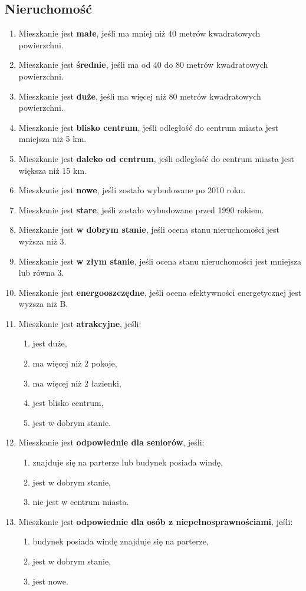 \subsection{Nieruchomość}
\begin{enumerate}[label=N\arabic*.]
    \item Mieszkanie jest \textbf{małe}, jeśli ma mniej niż 40 metrów kwadratowych powierzchni.
    \item Mieszkanie jest \textbf{średnie}, jeśli ma od 40 do 80 metrów kwadratowych powierzchni.
    \item Mieszkanie jest \textbf{duże}, jeśli ma więcej niż 80 metrów kwadratowych powierzchni.
    \item Mieszkanie jest \textbf{blisko centrum}, jeśli odległość do centrum miasta jest mniejsza niż 5 km.
    \item Mieszkanie jest \textbf{daleko od centrum}, jeśli odległość do centrum miasta jest większa niż 15 km.
    \item Mieszkanie jest \textbf{nowe}, jeśli zostało wybudowane po 2010 roku.
    \item Mieszkanie jest \textbf{stare}, jeśli zostało wybudowane przed 1990 rokiem.
    \item Mieszkanie jest \textbf{w dobrym stanie}, jeśli ocena stanu nieruchomości jest wyższa niż 3.
    \item Mieszkanie jest \textbf{w złym stanie}, jeśli ocena stanu nieruchomości jest mniejsza lub równa 3.
    \item Mieszkanie jest \textbf{energooszczędne}, jeśli ocena efektywności energetycznej jest wyższa niż B.
    \item Mieszkanie jest \textbf{atrakcyjne}, jeśli:
    \begin{enumerate}[label=\arabic*.]
        \item jest duże,
        \item ma więcej niż 2 pokoje,
        \item ma więcej niż 2 łazienki,
        \item jest blisko centrum,
        \item jest w dobrym stanie.
    \end{enumerate}
    \item Mieszkanie jest \textbf{odpowiednie dla seniorów}, jeśli:
    \begin{enumerate}[label=\arabic*.]
        \item znajduje się na parterze lub budynek posiada windę,
        \item jest w dobrym stanie,
        \item nie jest w centrum miasta.
    \end{enumerate}
    \item Mieszkanie jest \textbf{odpowiednie dla osób z niepełnosprawnościami}, jeśli:
    \begin{enumerate}[label=\arabic*.]
        \item budynek posiada windę znajduje się na parterze,
        \item jest w dobrym stanie,
        \item jest nowe.
    \end{enumerate}
\end{enumerate}

